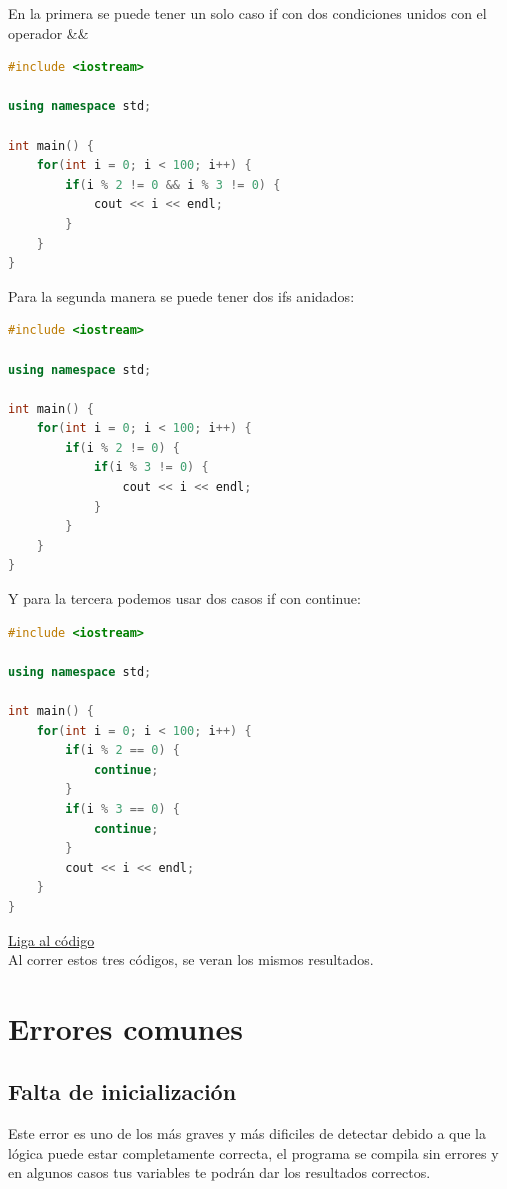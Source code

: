 \documentclass{article}
\begin{document}
En la primera se puede tener un solo caso if con dos condiciones unidos con el operador \&\&

\begin{lstlisting}[language=C++, caption=Condiciones con and]
#include <iostream>

using namespace std;

int main() {
    for(int i = 0; i < 100; i++) {
        if(i % 2 != 0 && i % 3 != 0) {
            cout << i << endl;
        }
    }
}
\end{lstlisting}

Para la segunda manera se puede tener dos ifs anidados:

\begin{lstlisting}[language=C++, caption=Dos condiciones]
#include <iostream>

using namespace std;

int main() {
    for(int i = 0; i < 100; i++) {
        if(i % 2 != 0) {
            if(i % 3 != 0) {
                cout << i << endl;
            }
        }
    }
}
\end{lstlisting}

Y para la tercera podemos usar dos casos if con continue:

\begin{lstlisting}[language=C++, caption=Continue]
#include <iostream>

using namespace std;

int main() {
    for(int i = 0; i < 100; i++) {
        if(i % 2 == 0) {
            continue;
        }
        if(i % 3 == 0) {
            continue;
        }
        cout << i << endl;
    }
}
\end{lstlisting}
\href{https://repl.it/@Jamesscn/Numeros-no-hexagonales}{Liga al código}\\

Al correr estos tres códigos, se veran los mismos resultados.

\section{Errores comunes}

\subsection{Falta de inicialización}
Este error es uno de los más graves y más dificiles de detectar debido a que la lógica puede estar completamente correcta, el programa se compila sin errores y en algunos casos tus variables te podrán dar los resultados correctos.
\end{document}
